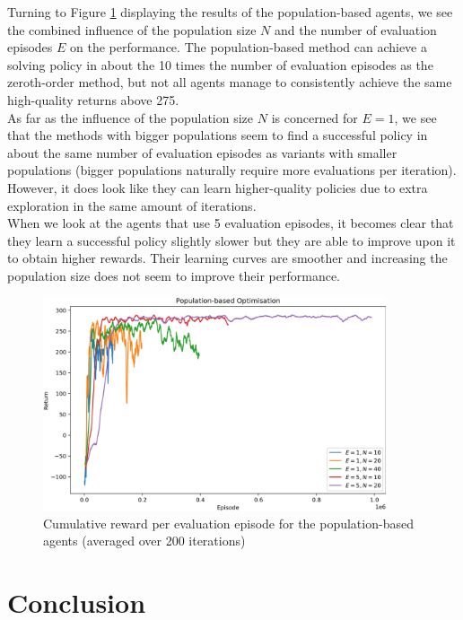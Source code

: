 \documentclass[10pt]{article}
\begin{document}
Turning to Figure \ref{fig:population} displaying the results of the population-based agents, we see
the combined influence of the population size $N$ and the number of evaluation episodes $E$ on the performance.
The population-based method can achieve a solving policy in about the 10 times the number of evaluation episodes as the zeroth-order method, but not all agents manage to consistently achieve the same high-quality returns above 275.\\
As far as the influence of the population size $N$ is concerned for $E=1$, we see that the methods
with bigger populations seem to find a successful policy in about the same number of evaluation episodes
as variants with smaller populations
(bigger populations naturally require more evaluations per iteration).
However, it does look like they can learn higher-quality policies due to extra exploration in the same amount of iterations.\\
When we look at the agents that use 5 evaluation episodes, it becomes clear that they learn a successful policy
slightly slower but they are able to improve upon it to obtain higher rewards. Their learning curves are
smoother and increasing the population size does not seem to improve their performance.

\begin{figure}[h]
    \centering
    \includegraphics[width=0.9\textwidth]{checkpoints/FINAL/population.png}
    \caption{Cumulative reward per evaluation episode for the population-based agents (averaged over 200 iterations)}
    \label{fig:population}
\end{figure}

\section{Conclusion}
\end{document}
